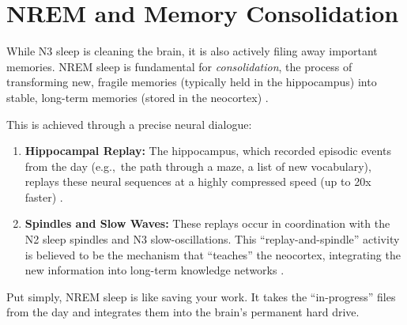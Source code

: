 \section{NREM and Memory Consolidation}\label{sec:consolidation}

While N3 sleep is cleaning the brain, it is also actively filing away important memories. NREM sleep is fundamental for \textit{consolidation}, the process of transforming new, fragile memories (typically held in the hippocampus) into stable, long-term memories (stored in the neocortex) \citep{rasch2007}.

This is achieved through a precise neural dialogue:
\begin{enumerate}
    \item \textbf{Hippocampal Replay:} The hippocampus, which recorded episodic events from the day (e.g.,~the path through a maze, a list of new vocabulary), replays these neural sequences at a highly compressed speed (up to 20x faster) \citep{wilson1994reactivation, ji2007}.
    \item \textbf{Spindles and Slow Waves:} These replays occur in coordination with the N2 sleep spindles and N3 slow-oscillations. This ``replay-and-spindle'' activity is believed to be the mechanism that ``teaches'' the neocortex, integrating the new information into long-term knowledge networks \citep{rasch2007}.
\end{enumerate}
Put simply, NREM sleep is like saving your work. It takes the ``in-progress'' files from the day and integrates them into the brain's permanent hard drive.
